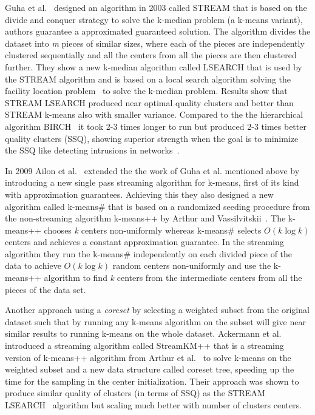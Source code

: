 Guha et al.~\citep{Guha:2003} designed an algorithm in 2003 called STREAM that is based on the divide and conquer strategy to solve the k-median problem (a k-means variant), authors guarantee a approximated guaranteed solution. The algorithm divides the dataset into \textit{m} pieces of similar sizes, where each of the pieces are independently clustered sequentially and all the centers from all the pieces are then clustered further. They show a new k-median algorithm called LSEARCH that is used by the STREAM algorithm and is based on a local search algorithm solving the facility location problem~\citep{Charikar:1999} to solve the k-median problem. Results show that STREAM LSEARCH produced near optimal quality clusters and better than STREAM k-means also with smaller variance. Compared to the the hierarchical algorithm BIRCH~\citep{Zhang:1996} it took 2-3 times longer to run but produced 2-3 times better quality clusters (SSQ), showing superior strength when the goal is to minimize the SSQ like detecting intrusions in networks~\citep{Marchette:1999NI}. 

In 2009 Ailon et al.~\citep{Ailon:2009} extended the the work of Guha et al. mentioned above by introducing a new single pass streaming algorithm for k-means, first of its kind with approximation guarantees. Achieving this they also designed a new algorithm called k-means\# that is based on a randomized seeding procedure from the non-streaming algorithm k-means++ by Arthur and Vassilvitskii~\citep{Arthur:2007}. The k-means++ chooses \textit{k} centers non-uniformly whereas k-means\# selects $O(k\log{k})$ centers and achieves a constant approximation guarantee. In the streaming algorithm they run the k-means\# independently on each divided piece of the data to achieve $O(k \log{k})$ random centers non-uniformly and use the k-means++ algorithm to find \textit{k} centers from the intermediate centers from all the pieces of the data set. 

Another approach using a \textit{coreset} by selecting a weighted subset from the original dataset such that by running any k-means algorithm on the subset will give near similar results to running k-means on the whole dataset. Ackermann et al.~\citep{Ackermann:2010} introduced a streaming algorithm called StreamKM++ that is a streaming version of k-means++ algorithm from Arthur et al.~\citep{Arthur:2007} to solve k-means on the weighted subset and a new data structure called coreset tree, speeding up the time for the sampling in the center initialization. Their approach was shown to produce similar quality of clusters (in terms of SSQ) as the STREAM LSEARCH~\citep{Guha:2003} algorithm but scaling much better with number of clusters centers. 


